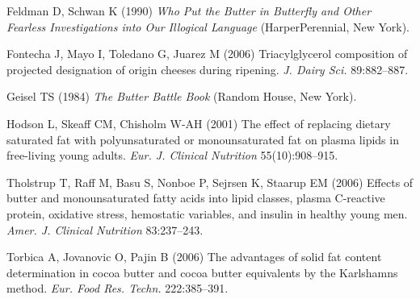 \documentclass[opre,nonblindrev]{informs3}
\begin{document}
\begin{thebibliography}{}

Feldman D, Schwan K (1990) {\it Who Put the Butter in Butterfly
and Other Fearless Investigations into Our Illogical Language}
(HarperPerennial, New York).

Fontecha J, Mayo I, Toledano G, Juarez M (2006)
Triacylglycerol composition  of projected designation
of origin cheeses during ripening. {\it J. Dairy Sci.} 89:882--887.

Geisel TS (1984) {\it The Butter Battle Book\/} (Random House, New York).

Hodson L, Skeaff CM, Chisholm W-AH (2001) The effect of
replacing dietary saturated fat with polyunsaturated or
monounsaturated fat on plasma lipids in free-living young adults.
{\it Eur. J. Clinical Nutrition} 55(10):908--915.

Tholstrup T, Raff M, Basu S, Nonboe P, Sejrsen K, Staarup EM (2006) 
Effects of butter and mono\-un\-saturated fatty acids
into lipid classes, plasma C-reactive protein, oxidative stress,
hemostatic variables, and insulin in healthy young men. {\it Amer. J.
Clinical Nutrition} 83:237--243.

Torbica A, Jovanovic O, Pajin B (2006) The advantages of solid
fat content determination in cocoa butter and cocoa butter
equivalents by the Karlshamns method. {\it Eur. Food Res. Techn.} 222:385--391.

\end{thebibliography}

\end{document}
